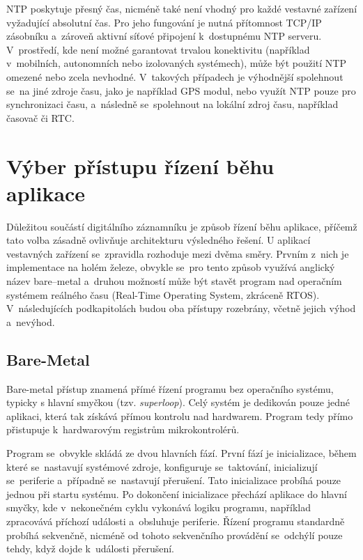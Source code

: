 NTP poskytuje přesný čas, nicméně také není vhodný pro každé vestavné zařízení vyžadující absolutní čas. Pro jeho fungování je nutná přítomnost TCP/IP zásobníku a~zároveň aktivní síťové připojení k~dostupnému NTP serveru. V~prostředí, kde není možné garantovat trvalou konektivitu (například v~mobilních, autonomních nebo izolovaných systémech), může být použití NTP omezené nebo zcela nevhodné. V~takových případech je výhodnější spolehnout se~na jiné zdroje času, jako je například GPS modul, nebo využít NTP pouze pro synchronizaci času, a~následně se~spolehnout na lokální zdroj času, například časovač či RTC.

\section{Výber přístupu řízení běhu aplikace}
Důležitou součástí digitálního záznamníku je způsob řízení běhu aplikace, příčemž tato volba zásadně ovlivňuje architekturu výsledného řešení. U aplikací vestavných zařízení se~zpravidla rozhoduje mezi dvěma směry. Prvním z~nich je implementace na holém železe, obvykle se~pro tento způsob využívá anglický název bare--metal a~druhou možností může být stavět program nad operačním systémem reálného času (Real-Time Operating System, zkráceně RTOS). V~následujících podkapitolách budou oba přístupy rozebrány, včetně jejich výhod a~nevýhod. 

\subsection{Bare-Metal}
Bare-metal přístup znamená přímé řízení programu bez operačního systému, typicky s hlavní smyčkou (tzv. \emph{superloop}). Celý systém je dedikován pouze jedné aplikaci, která tak získává přímou kontrolu nad hardwarem. Program tedy přímo přistupuje k~hardwarovým registrům mikrokontrolérů.~\cite{sysgo_baremetal_vs_rtos}

Program se~obvykle skládá ze dvou hlavních fází. První fází je inicializace, během které se~nastavují systémové zdroje, konfiguruje se~taktování, inicializují se~periferie a~případně se~nastavují přerušení. Tato inicializace probíhá pouze jednou při startu systému. Po dokončení inicializace přechází aplikace do hlavní smyčky, kde v~nekonečném cyklu vykonává logiku programu, například zpracovává příchozí události a~obsluhuje periferie. Řízení programu standardně probíhá sekvenčně, nicméně od tohoto sekvenčního provádění se~odchýlí pouze tehdy, když dojde k~události přerušení.~\cite{sysgo_baremetal_vs_rtos}

